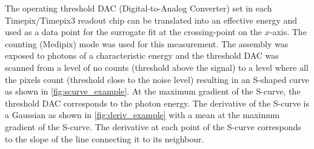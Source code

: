 The operating threshold DAC (Digital-to-Analog Converter) set in each
Timepix/Timepix3 readout chip can be translated into an effective
energy and used as a data point for the surrogate fit at the
crossing-point on the $x$-axis. The counting (Medipix) mode was used
for this measurement. The assembly was exposed to photons of a
characteristic energy and the threshold DAC was scanned from a level
of no counts (threshold above the signal) to a level where all the
pixels count (threshold close to the noise level) resulting in an
S-shaped curve as shown in \cref{fig:scurve_example}. At the
maximum gradient of the S-curve, the threshold DAC corresponds to the
photon energy. The derivative of the S-curve is a Gaussian as shown in
\cref{fig:deriv_example} with a mean at the maximum gradient of
the S-curve. The derivative at each point of the S-curve corresponds
to the slope of the line connecting it to its neighbour.

